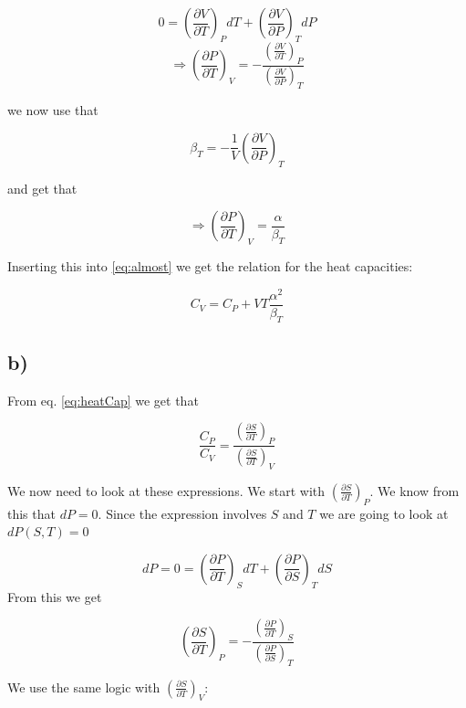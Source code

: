 \documentclass[a4paper,norsk, 10pt]{article}
\newcommand{\pd}[2]{\frac{\partial #1}{\partial #2}}
\begin{document}
\begin{equation}
0 = \left(\pd{V}{T}\right)_P dT + \left(\pd{V}{P}\right)_T dP
\end{equation}
\begin{equation}
\Rightarrow \left(\pd{P}{T}\right)_V = - \frac{\left(\pd{V}{T}\right)_P}{\left(\pd{V}{P}\right)_T}
\end{equation}

we now use that 

\begin{equation}
\beta_T = -\frac{1}{V}\left(\pd{V}{P}\right)_T
\end{equation}

and get that

\begin{equation}
\Rightarrow \left(\pd{P}{T}\right)_V = \frac{\alpha}{\beta_T}
\end{equation}

Inserting this into \eqref{eq:almost} we get the relation for the heat capacities:

\begin{equation}
C_V = C_P + VT\frac{\alpha^2}{\beta_T}
\end{equation}

\subsection{b)}

From eq. \eqref{eq:heatCap} we get that

\begin{equation}
\frac{C_P}{C_V} = \frac{\left(\pd{S}{T}\right)_P}{\left(\pd{S}{T}\right)_V}
\label{eq:cp/cv}
\end{equation}

We now need to look at these expressions. We start with $\left(\pd{S}{T}\right)_P$. We know from this that $dP = 0$. Since the expression involves $S$ and $T$ we are going to look at $dP(S,T) = 0$

\begin{equation}
dP = 0 = \left(\pd{P}{T}\right)_S dT + \left(\pd{P}{S}\right)_T dS
\end{equation}
From this we get

\begin{equation}
\left(\pd{S}{T}\right)_P = -\frac{\left(\pd{P}{T}\right)_S}{\left(\pd{P}{S}\right)_T}
\end{equation}

We use the same logic with $\left(\pd{S}{T}\right)_V$:
\end{document}
